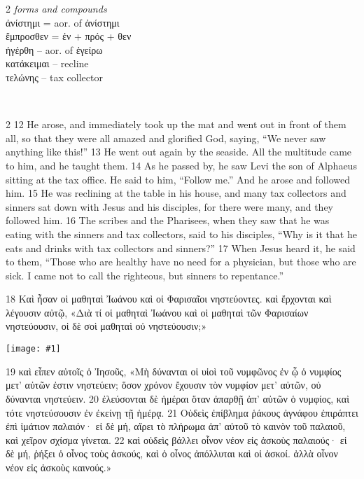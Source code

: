 \documentclass[10pt,a5paper,twoside,twocolumn]{book}
\newcommand{\fig}[1]{\texttt{[image: \#1]}\label{fig:#1}}
\newcommand*\cleartoleftpage{%
  \ifodd\value{page}\hbox{}\clearpage\fi
}
\newcommand{\separator}{
  \vspace{-0.5\baselineskip}%
  \hspace{0.27\textwidth}%
  \noindent\makebox[\linewidth]{\resizebox{0.3333\linewidth}{1pt}{$\bullet$}}\bigskip%
  \vspace{-0.5\baselineskip}
}
\newenvironment{facing}{\cleartoleftpage}{\clearpage\pagebreak}
\newenvironment{help}{\clearpage}{}
\newenvironment{helpsec}{\begin{minipage}[t]{\textwidth}\begin{multicols}{2}}{\end{multicols}\end{minipage}}
\newenvironment{vocab}{\begin{helpsec}}{\end{helpsec}}
\newenvironment{translation}{\separator\\\begin{helpsec}\footnotesize}{\end{helpsec}}
\begin{document}
\begin{facing}
\begin{help}
\begin{vocab}
\emph{forms and compounds}\\
ἀνίστημι = aor. of ἀνίστημι\\
ἔμπροσθεν = ἐν + πρός + θεν \\
ἠγέρθη -- aor. of ἐγείρω\\
κατάκειμαι -- recline\\
τελώνης -- tax collector\\
\end{vocab}
\begin{translation}
 12 He arose, and immediately took up the mat and went out in front of them all, so that they were all amazed and glorified God, saying, ``We never saw anything like this!''
13 He went out again by the seaside. All the multitude came to him, and he taught them. 14 As he passed by, he saw Levi the son of Alphaeus sitting at the tax office. He said to him, ``Follow me.'' And he arose and followed him.
15 He was reclining at the table in his house, and many tax collectors and sinners sat down with Jesus and his disciples, for there were many, and they followed him. 16 The scribes and the Pharisees, when they saw that he was eating with the sinners and tax collectors, said to his disciples, ``Why is it that he eats and drinks with tax collectors and sinners?''
17 When Jesus heard it, he said to them, ``Those who are healthy have no need for a physician, but those who are sick. I came not to call the righteous, but sinners to repentance.'' 
\end{translation}
\end{help}
\end{facing}


18 Καὶ ἦσαν οἱ μαθηταὶ Ἰωάνου καὶ οἱ Φαρισαῖοι νηστεύοντες. καὶ ἔρχονται καὶ λέγουσιν αὐτῷ,
«Διὰ τί οἱ μαθηταὶ Ἰωάνου καὶ οἱ μαθηταὶ τῶν Φαρισαίων νηστεύουσιν, οἱ δὲ σοὶ μαθηταὶ οὐ νηστεύουσιν;»

\fig{02-19} %

19 καὶ εἶπεν αὐτοῖς ὁ Ἰησοῦς, «Μὴ δύνανται οἱ υἱοὶ τοῦ νυμφῶνος ἐν ᾧ ὁ νυμφίος μετ’ αὐτῶν ἐστιν νηστεύειν; ὅσον χρόνον ἔχουσιν τὸν νυμφίον μετ’ αὐτῶν, οὐ δύνανται νηστεύειν. 20 ἐλεύσονται δὲ ἡμέραι ὅταν ἀπαρθῇ ἀπ’ αὐτῶν ὁ νυμφίος, καὶ τότε νηστεύσουσιν ἐν ἐκείνῃ τῇ ἡμέρᾳ. 21 Οὐδεὶς ἐπίβλημα ῥάκους ἀγνάφου ἐπιράπτει ἐπὶ ἱμάτιον παλαιόν· εἰ δὲ μή, αἴρει τὸ πλήρωμα ἀπ’ αὐτοῦ τὸ καινὸν τοῦ παλαιοῦ, καὶ χεῖρον σχίσμα γίνεται. 22 καὶ οὐδεὶς βάλλει οἶνον νέον εἰς ἀσκοὺς παλαιούς· εἰ δὲ μή, ῥήξει ὁ οἶνος τοὺς ἀσκούς, καὶ ὁ οἶνος ἀπόλλυται καὶ οἱ ἀσκοί. ἀλλὰ οἶνον νέον εἰς ἀσκοὺς καινούς.»
\end{document}
